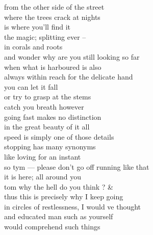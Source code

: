 from the other side of the street\\
where the trees crack at nights\\
is where you'll find it\\
the magic; splitting ever --\\
in corals and roots\\
and wonder why are you still looking so far\\
when what is harboured is also\\
always within reach for the delicate hand\\

you can let it fall\\
or try to grasp at the stems\\
catch you breath however\\
going fast makes no distinction\\
in the great beauty of it all\\
speed is simply one of those details\\

stopping has many synonyms\\
like loving for an instant\\
so tym --- please don't go off running like that\\
it is here; all around you\\
tom why the hell do you think ? \& \\
thus this is precisely why I keep going\\
in circles of restlessness, I would ve thought\\
and educated man such as yourself\\
would comprehend such things\\
